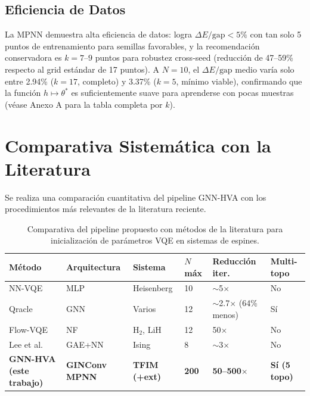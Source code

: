 \documentclass[11pt,a4paper,spanish]{book}
\begin{document}
\subsection{Eficiencia de Datos}
\label{sec:eficiencia_datos}

La MPNN demuestra alta eficiencia de datos: logra $\Delta E/\text{gap} < 5\%$ con tan solo 5 puntos de entrenamiento para semillas favorables, y la recomendación conservadora es $k = 7$--$9$ puntos para robustez cross-seed (reducción de 47--59\% respecto al grid estándar de 17 puntos). A $N = 10$, el $\Delta E/\text{gap}$ medio varía solo entre 2.94\% ($k = 17$, completo) y 3.37\% ($k = 5$, mínimo viable), confirmando que la función $h \mapsto \theta^*$ es suficientemente suave para aprenderse con pocas muestras (véase Anexo A para la tabla completa por $k$).

\section{Comparativa Sistemática con la Literatura}

Se realiza una comparación cuantitativa del pipeline GNN-HVA con los procedimientos más relevantes de la literatura reciente.

\begin{table}[h]
\centering
\caption{Comparativa del pipeline propuesto con métodos de la literatura para inicialización de parámetros VQE en sistemas de espines.}
\label{tab:comparison_literature}
\begin{tabular}{p{2.5cm}p{2cm}p{2cm}p{2cm}p{2.5cm}p{2cm}}
\toprule
\textbf{Método} & \textbf{Arquitectura} & \textbf{Sistema} & \textbf{$N$ máx} & \textbf{Reducción iter.} & \textbf{Multi-topo} \\
\midrule
NN-VQE \citep{miao2024} & MLP & Heisenberg & 10 & $\sim$5$\times$ & No \\
Qracle \citep{zhang2025} & GNN & Varios & 12 & $\sim$2.7$\times$ (64\% menos) & Sí \\
Flow-VQE \citep{zou2026} & NF & H$_2$, LiH & 12 & 50$\times$ & No \\
Lee et al. \citep{lee2026} & GAE+NN & Ising & 8 & $\sim$3$\times$ & No \\
\midrule
\textbf{GNN-HVA (este trabajo)} & \textbf{GINConv MPNN} & \textbf{TFIM (+ext)} & \textbf{200} & \textbf{50--500$\times$} & \textbf{Sí (5 topo)} \\
\bottomrule
\end{tabular}
\end{table}
\end{document}
